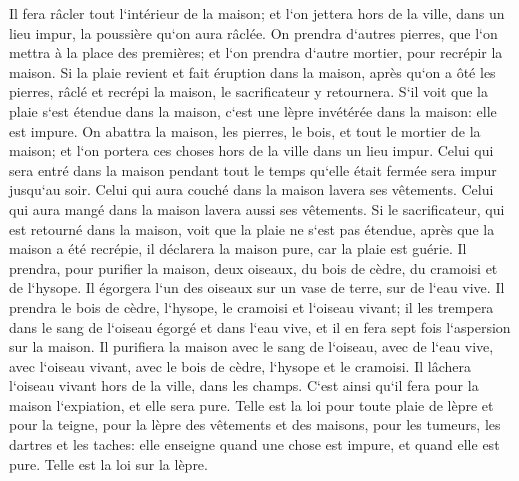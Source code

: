 \verse Il fera râcler tout l`intérieur de la maison; et l`on jettera hors de la ville, dans un lieu impur, la poussière qu`on aura râclée. 
\verse On prendra d`autres pierres, que l`on mettra à la place des premières; et l`on prendra d`autre mortier, pour recrépir la maison. 
\verse Si la plaie revient et fait éruption dans la maison, après qu`on a ôté les pierres, râclé et recrépi la maison, 
\verse le sacrificateur y retournera. S`il voit que la plaie s`est étendue dans la maison, c`est une lèpre invétérée dans la maison: elle est impure. 
\verse On abattra la maison, les pierres, le bois, et tout le mortier de la maison; et l`on portera ces choses hors de la ville dans un lieu impur. 
\verse Celui qui sera entré dans la maison pendant tout le temps qu`elle était fermée sera impur jusqu`au soir. 
\verse Celui qui aura couché dans la maison lavera ses vêtements. Celui qui aura mangé dans la maison lavera aussi ses vêtements. 
\verse Si le sacrificateur, qui est retourné dans la maison, voit que la plaie ne s`est pas étendue, après que la maison a été recrépie, il déclarera la maison pure, car la plaie est guérie. 
\verse Il prendra, pour purifier la maison, deux oiseaux, du bois de cèdre, du cramoisi et de l`hysope. 
\verse Il égorgera l`un des oiseaux sur un vase de terre, sur de l`eau vive. 
\verse Il prendra le bois de cèdre, l`hysope, le cramoisi et l`oiseau vivant; il les trempera dans le sang de l`oiseau égorgé et dans l`eau vive, et il en fera sept fois l`aspersion sur la maison. 
\verse Il purifiera la maison avec le sang de l`oiseau, avec de l`eau vive, avec l`oiseau vivant, avec le bois de cèdre, l`hysope et le cramoisi. 
\verse Il lâchera l`oiseau vivant hors de la ville, dans les champs. C`est ainsi qu`il fera pour la maison l`expiation, et elle sera pure. 
\verse Telle est la loi pour toute plaie de lèpre et pour la teigne, 
\verse pour la lèpre des vêtements et des maisons, 
\verse pour les tumeurs, les dartres et les taches: 
\verse elle enseigne quand une chose est impure, et quand elle est pure. Telle est la loi sur la lèpre. 

